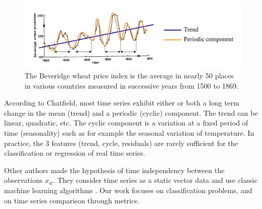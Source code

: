 \begin{figure}[h!]
	\centering
	\includegraphics[width=1\linewidth]{images/time_series_example}
	\caption{The Beveridge wheat price index is the average in nearly 50 places in various countries measured in successive years from 1500 to 1869\protect\footnotemark.}
	\label{fig:time_series_example}
\end{figure}

\noindent According to Chatfield, most time series exhibit either or both a long term change in the mean (trend) and a periodic (cyclic) component. The trend can be linear, quadratic, etc. The cyclic component is a variation at a fixed period of time (seasonality) such as for example the seasonal variation of temperature. In practice, the 3 features (trend, cycle, residuals) are rarely sufficient for the classification or regression of real time series.

Other authors made the hypothesis of time independency between the observations $x_{it}$. They consider time series as a static vector data and use classic machine learning algorithms \cite{Liang2012,Cao2001,Hu2013,Hwang2012}. Our work focuses on classification problems, and on time series comparison through metrics.





\newpage
